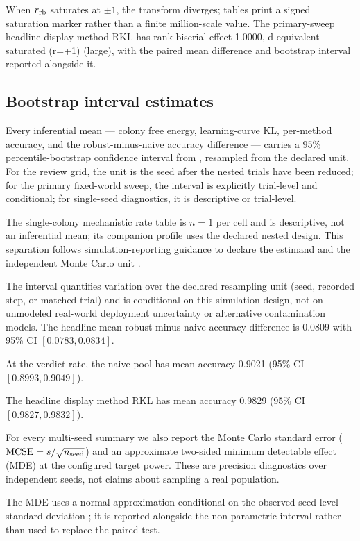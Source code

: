 \documentclass[
  english,
]{article}
\theoremstyle{plain}
\theoremstyle{definition}
\theoremstyle{remark}
\theoremstyle{definition}
\begin{document}
When \(r_{\rm rb}\) saturates at \(\pm1\), the transform diverges;
tables print a signed saturation marker rather than a finite
million-scale value. The primary-sweep headline display method RKL has
rank-biserial effect 1.0000, d-equivalent saturated (r=+1) (large), with
the paired mean difference and bootstrap interval reported alongside it.

\subsection{Bootstrap interval estimates}\label{sec:methods-bootstrap}

Every inferential mean --- colony free energy, learning-curve KL,
per-method accuracy, and the robust-minus-naive accuracy difference ---
carries a 95\% percentile-bootstrap confidence interval
\citep{efron1993bootstrap} from ,
resampled from the declared unit. For the review grid, the unit is the
seed after the nested trials have been reduced; for the primary
fixed-world sweep, the interval is explicitly trial-level and
conditional; for single-seed diagnostics, it is descriptive or
trial-level.

The single-colony mechanistic rate table is \(n=1\) per cell and is
descriptive, not an inferential mean; its companion profile uses the
declared nested design. This separation follows simulation-reporting
guidance to declare the estimand and the independent Monte Carlo unit
\citep{morris2019simulation}.

The interval quantifies variation over the declared resampling unit
(seed, recorded step, or matched trial) and is conditional on this
simulation design, not on unmodeled real-world deployment uncertainty or
alternative contamination models. The headline mean robust-minus-naive
accuracy difference is 0.0809 with 95\% CI \([0.0783, 0.0834]\).

At the verdict rate, the naive pool has mean accuracy 0.9021 (95\% CI
\([0.8993, 0.9049]\)).

The headline display method RKL has mean accuracy 0.9829 (95\% CI
\([0.9827, 0.9832]\)).

For every multi-seed summary we also report the Monte Carlo standard
error (\(\mathrm{MCSE} = s/\sqrt{n_{\rm seed}}\)) and an approximate
two-sided minimum detectable effect (MDE) at the configured target
power. These are precision diagnostics over independent seeds, not
claims about sampling a real population.

The MDE uses a normal approximation conditional on the observed
seed-level standard deviation \citep{koehler2009mcse}; it is reported
alongside the non-parametric interval rather than used to replace the
paired test.
\end{document}
